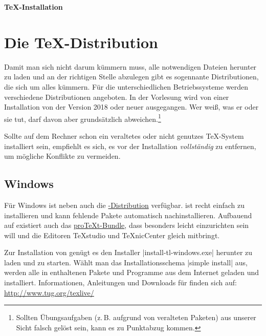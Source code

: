\documentclass[
	vorläufig=false, 
	datum=2021-10-20,
	titel=Installationshinweise,
]{../tex/latexkurs-exercise}
\begin{document}
\begin{center}
\sffamily\bfseries\Large \TeX-Installation
\end{center}
\begin{abstract}
\noindent
Diese Anleitung erklärt ganz grundlegend, wie man eine aktuelle \TeXlive-\linebreak Distribution Installiert, die für den \LaTeX-Kurs vorausgesetzt wird.
Ein funktionierendes \TeX-System besteht im Grundsatz aus zwei Teilen: einer \TeX-Distribution und einem 
Editor.
\end{abstract}

\section{Die \TeX-Distribution}
Damit man sich nicht darum kümmern muss, alle notwendigen Dateien herunter zu laden und an der richtigen Stelle abzulegen gibt es sogennante Distributionen, die sich um alles kümmern. Für die unterschiedlichen Betriebssysteme werden verschiedene Distributionen angeboten. In der Vorlesung wird von einer Installation von \href{http://www.tug.org/texlive/}{\TeXlive} der Version 2018 oder neuer ausgegangen. Wer weiß, was er oder sie tut, darf davon aber grundsätzlich abweichen.\footnote{Sollten Übungsaufgaben (z.\,B. aufgrund von veralteten Paketen) aus unserer Sicht falsch gelöst sein, kann es zu Punktabzug kommen.}

Sollte auf dem Rechner schon ein veraltetes oder nicht genutzes \TeX-System installiert sein, empfiehlt es sich, es vor der Installation \emph{vollständig} zu entfernen, um mögliche Konflikte zu vermeiden.

\subsection*{Windows}
Für Windows ist neben \href{http://www.tug.org/texlive/}{\TeXlive} auch die \href{http://www.miktex.org/}{\MikTeX-Distribution} verfügbar. \MikTeX ist recht einfach zu installieren und kann fehlende Pakete automatisch nachinstallieren. Aufbauend auf \MikTeX existiert auch das \href{http://www.tug.org/protext/}{pro\TeX t-Bundle}, dass besonders leicht einzurichten sein will und die Editoren \TeX studio und \TeX nicCenter gleich mitbringt.

Zur Installation von \TeXlive genügt es den Installer |install-tl-windows.exe| herunter zu laden und zu starten. Wählt man das Installationsschema |simple install| aus, werden alle in \TeXlive enthaltenen Pakete und Programme aus dem Internet geladen und installiert. Informationen, Anleitungen und Downloads für \TeXlive finden sich auf:\\ \url{http://www.tug.org/texlive/}
\end{document}
